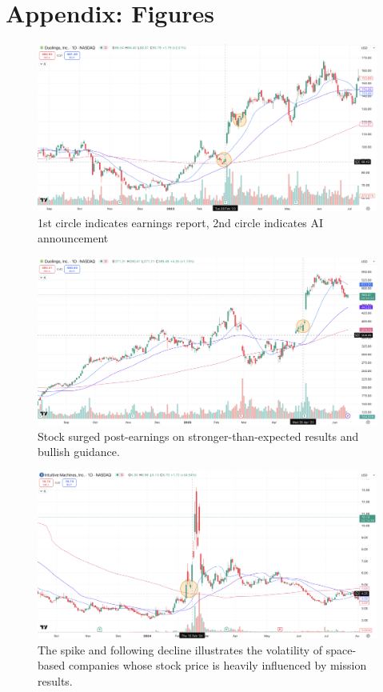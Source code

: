 \documentclass[11pt]{article}
\begin{document}
\newpage
\section{Appendix: Figures}
    \begin{figure}[H]
        \centering
        \includegraphics[width=1.0\linewidth]{images/DUOL1.png}
        \caption{1st circle indicates earnings report, 2nd circle indicates AI announcement}
        \label{fig:DUOL1}
    \end{figure}
    \begin{figure}[H]
        \centering 
        \includegraphics[width=1.0\linewidth]{images/DUOL2.png}
        \caption{Stock surged post-earnings on stronger-than-expected results and bullish guidance.}
        \label{fig:DUOL2}
    \end{figure}
    \begin{figure}[H]
        \centering
        \includegraphics[width=1.0\linewidth]{images/LUNR1.png}
        \caption{The spike and following decline illustrates the volatility of space-based companies whose stock price is heavily influenced by mission results.}
        \label{fig:LUNR1}
    \end{figure}
\end{document}
